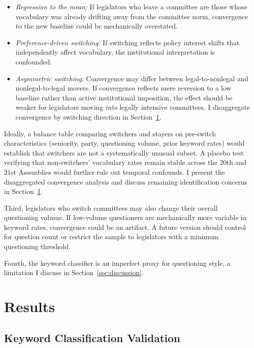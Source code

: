 \documentclass[11pt]{article}
\begin{document}
\begin{itemize}
\item \textit{Regression to the mean:} If legislators who leave a committee are those whose vocabulary was already drifting away from the committee norm, convergence to the new baseline could be mechanically overstated.
\item \textit{Preference-driven switching:} If switching reflects policy interest shifts that independently affect vocabulary, the institutional interpretation is confounded.
\item \textit{Asymmetric switching:} Convergence may differ between legal-to-nonlegal and nonlegal-to-legal movers. If convergence reflects mere reversion to a low baseline rather than active institutional imposition, the effect should be weaker for legislators moving \textit{into} legally intensive committees. I disaggregate convergence by switching direction in Section~\ref{sec:results}.
\end{itemize}

\noindent Ideally, a balance table comparing switchers and stayers on pre-switch characteristics (seniority, party, questioning volume, prior keyword rates) would establish that switchers are not a systematically unusual subset. A placebo test verifying that non-switchers' vocabulary rates remain stable across the 20th and 21st Assemblies would further rule out temporal confounds. I present the disaggregated convergence analysis and discuss remaining identification concerns in Section~\ref{sec:results}.

Third, legislators who switch committees may also change their overall questioning volume. If low-volume questioners are mechanically more variable in keyword rates, convergence could be an artifact. A future version should control for question count or restrict the sample to legislators with a minimum questioning threshold.

Fourth, the keyword classifier is an imperfect proxy for questioning style, a limitation I discuss in Section~\ref{sec:discussion}.


\section{Results}
\label{sec:results}

\subsection{Keyword Classification Validation}
\end{document}

